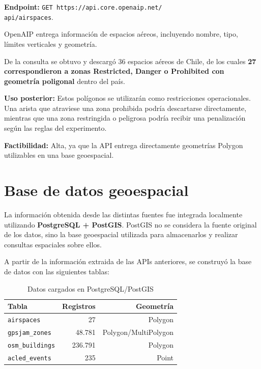 \documentclass[journal,10pt]{IEEEtran}
\begin{document}
\textbf{Endpoint:}
\texttt{GET https://api.core.openaip.net/ \\ api/airspaces}.

OpenAIP entrega información de espacios aéreos, incluyendo nombre, tipo, límites verticales y
geometría.

De la consulta se obtuvo y descargó 36 espacios aéreos de Chile, de los cuales
\textbf{27 correspondieron a zonas Restricted, Danger o Prohibited con geometría poligonal} dentro del país.

\textbf{Uso posterior:} Estos polígonos se utilizarán como restricciones operacionales. Una
arista que atraviese una zona prohibida podría descartarse directamente, mientras que una zona
restringida o peligrosa podría recibir una penalización según las reglas del experimento.

\textbf{Factibilidad:} Alta, ya que la API entrega directamente geometrías Polygon utilizables en una
base geoespacial.

\section{Base de datos geoespacial}

La información obtenida desde las distintas fuentes fue integrada localmente utilizando
\textbf{PostgreSQL + PostGIS}. PostGIS no se considera la fuente original de los datos, sino la
base geoespacial utilizada para almacenarlos y realizar consultas espaciales sobre ellos.

A partir de la información extraida de las APIs anteriores, se construyó la base de datos con las siguientes tablas:

\begin{table}[!h]
\centering
\caption{Datos cargados en PostgreSQL/PostGIS}
\label{tab:postgis}
\begin{tabular}{lrr}
\toprule
\textbf{Tabla} & \textbf{Registros} & \textbf{Geometría} \\
\midrule
\texttt{airspaces} & 27 & Polygon \\
\texttt{gpsjam\_zones} & 48.781 & Polygon/MultiPolygon \\
\texttt{osm\_buildings} & 236.791 & Polygon \\
\texttt{acled\_events} & 235 & Point \\
\bottomrule
\end{tabular}
\end{table}
\end{document}
